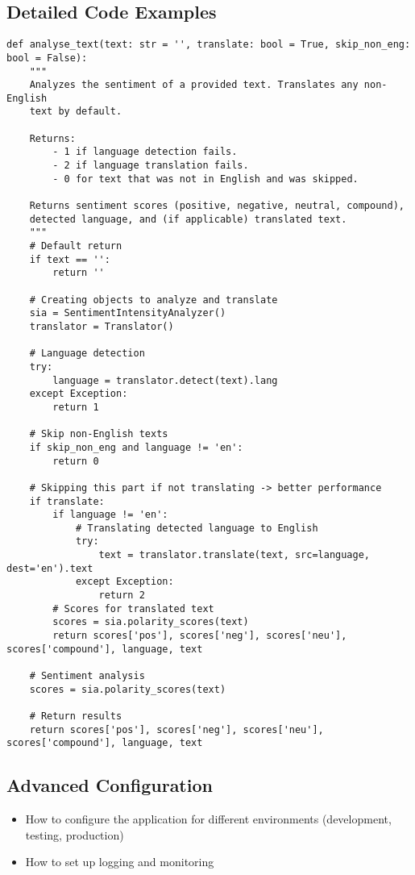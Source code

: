 \documentclass[a4paper]{article}
\begin{document}
\subsection{Detailed Code Examples}
\begin{verbatim}
def analyse_text(text: str = '', translate: bool = True, skip_non_eng: bool = False):
    """
    Analyzes the sentiment of a provided text. Translates any non-English 
    text by default.
    
    Returns:
        - 1 if language detection fails.
        - 2 if language translation fails.
        - 0 for text that was not in English and was skipped.
    
    Returns sentiment scores (positive, negative, neutral, compound),
    detected language, and (if applicable) translated text.
    """
    # Default return
    if text == '':
        return ''

    # Creating objects to analyze and translate
    sia = SentimentIntensityAnalyzer()
    translator = Translator()

    # Language detection
    try:
        language = translator.detect(text).lang
    except Exception:
        return 1

    # Skip non-English texts
    if skip_non_eng and language != 'en':
        return 0

    # Skipping this part if not translating -> better performance
    if translate:
        if language != 'en':
            # Translating detected language to English
            try:
                text = translator.translate(text, src=language, dest='en').text
            except Exception:
                return 2
        # Scores for translated text
        scores = sia.polarity_scores(text)
        return scores['pos'], scores['neg'], scores['neu'], scores['compound'], language, text

    # Sentiment analysis
    scores = sia.polarity_scores(text)
    
    # Return results
    return scores['pos'], scores['neg'], scores['neu'], scores['compound'], language, text
\end{verbatim}

\subsection{Advanced Configuration}
\begin{itemize}
    \item How to configure the application for different environments (development, testing, production)
    \item How to set up logging and monitoring
\end{itemize}
\end{document}

